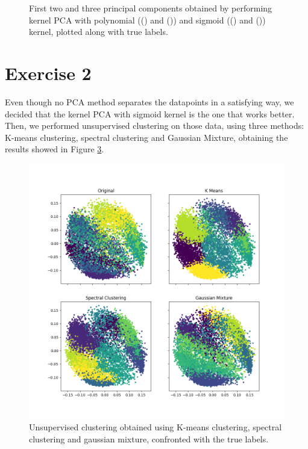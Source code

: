\documentclass[12pt]{article}
\begin{document}
\begin{figure}[h]
\begin{subfigure}{0.5\textwidth}
		\caption{}
		\label{subfig:pca_sigmoid_3comps}
	\end{subfigure}
	\caption{First two and three principal components obtained by performing kernel PCA with polynomial (() and ()) and sigmoid  (() and ()) kernel, plotted along with true labels.}
	\label{fig:pca_poly_sigmoid}
\end{figure}


\section{Exercise 2}
Even though no PCA method separates the datapoints in a satisfying way, we decided that the kernel PCA with sigmoid kernel is the one that works better. Then, we performed unsupervised clustering on those data, using three methods: K-means clustering, spectral clustering and Gaussian Mixture, obtaining the results showed in Figure \ref{fig:unsupervised_clustering}.\newline
\begin{figure}[h]
	\centering
	\includegraphics[width = 1 \textwidth]{unsupervised_clustering.png}
	\caption{Unsupervised clustering obtained using K-means clustering, spectral clustering and gaussian mixture, confronted with the true labels.}
	\label{fig:unsupervised_clustering}
\end{figure}
\end{document}
